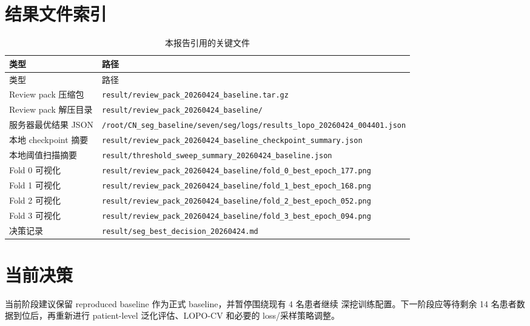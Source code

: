 \documentclass[UTF8,11pt]{ctexart}
\begin{document}
\section{结果文件索引}

\begin{longtable}{p{}p{}}
\caption{本报告引用的关键文件}\\
\toprule
类型 & 路径 \\
\midrule
\endfirsthead
\toprule
类型 & 路径 \\
\midrule
\endhead
Review pack 压缩包 & \texttt{result/review\_pack\_20260424\_baseline.tar.gz} \\
Review pack 解压目录 & \texttt{result/review\_pack\_20260424\_baseline/} \\
服务器最优结果 JSON & \texttt{/root/CN\_seg\_baseline/seven/seg/logs/results\_lopo\_20260424\_004401.json} \\
本地 checkpoint 摘要 & \texttt{result/review\_pack\_20260424\_baseline\_checkpoint\_summary.json} \\
本地阈值扫描摘要 & \texttt{result/threshold\_sweep\_summary\_20260424\_baseline.json} \\
Fold 0 可视化 & \texttt{result/review\_pack\_20260424\_baseline/fold\_0\_best\_epoch\_177.png} \\
Fold 1 可视化 & \texttt{result/review\_pack\_20260424\_baseline/fold\_1\_best\_epoch\_168.png} \\
Fold 2 可视化 & \texttt{result/review\_pack\_20260424\_baseline/fold\_2\_best\_epoch\_052.png} \\
Fold 3 可视化 & \texttt{result/review\_pack\_20260424\_baseline/fold\_3\_best\_epoch\_094.png} \\
决策记录 & \texttt{result/seg\_best\_decision\_20260424.md} \\
\bottomrule
\end{longtable}

\section{当前决策}

当前阶段建议保留 reproduced baseline 作为正式 baseline，并暂停围绕现有 4 名患者继续
深挖训练配置。下一阶段应等待剩余 14 名患者数据到位后，再重新进行 patient-level
泛化评估、LOPO-CV 和必要的 loss/采样策略调整。
\end{document}
